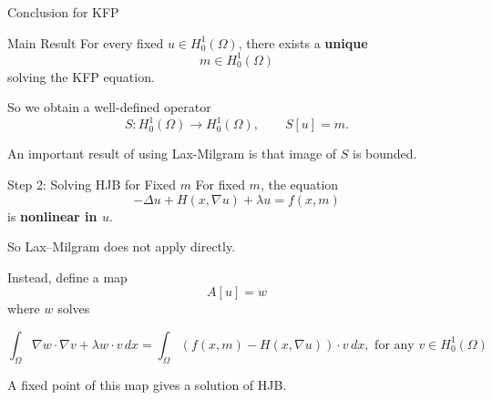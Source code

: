 \documentclass[aspectratio=169]{beamer}
\begin{document}
\begin{frame}{Conclusion for KFP}
\begin{block}{Main Result}
For every fixed \(u\in H_0^1(\Omega)\), there exists a \textbf{unique}
\[
m\in H_0^1(\Omega)
\]
solving the KFP equation.
\end{block}

\vspace{0.4cm}

So we obtain a well-defined operator
\[
S : H_0^1(\Omega)\to H_0^1(\Omega), \qquad S[u]=m.
\]

An important result of using Lax-Milgram is that image of \(S\) is bounded. 
\end{frame}
\begin{frame}{Step 2: Solving HJB for Fixed \(m\)}
For fixed \(m\), the equation
\[
-\Delta u + H(x,\nabla u) + \lambda u = f(x,m)
\]
is \textbf{nonlinear in \(u\)}.

\vspace{0.4cm}

So Lax--Milgram does not apply directly.

\vspace{0.4cm}

Instead, define a map
\[
A[u]=w
\]
where \(w\)  solves

\[\int_\Omega \nabla w \cdot \nabla v + \lambda w \cdot v \,dx = \int_\Omega (f(x,m) - H(x,\nabla u))\cdot v \,dx, \text{ for any } v \in H^1_0(\Omega)\]

A fixed point of this map gives a solution of HJB.
\end{frame}
\end{document}
